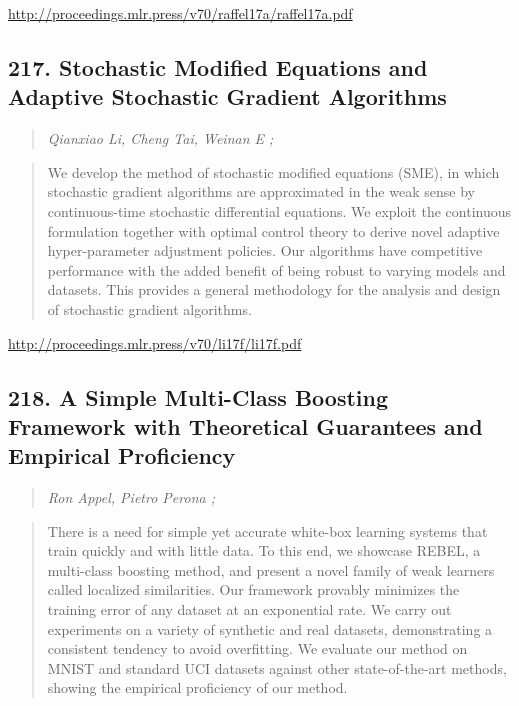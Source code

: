 \documentclass{article}
\begin{document}
\href{http://proceedings.mlr.press/v70/raffel17a/raffel17a.pdf}{http://proceedings.mlr.press/v70/raffel17a/raffel17a.pdf}

\subsection{217. Stochastic Modified Equations and Adaptive Stochastic Gradient Algorithms}

\begin{quote}
\footnotesize{\textit{Qianxiao Li, Cheng Tai, Weinan E ;}}
\end{quote}

\begin{quote}
    We develop the method of stochastic modified equations (SME), in which stochastic gradient algorithms are approximated in the weak sense by continuous-time stochastic differential equations. We exploit the continuous formulation together with optimal control theory to derive novel adaptive hyper-parameter adjustment policies. Our algorithms have competitive performance with the added benefit of being robust to varying models and datasets. This provides a general methodology for the analysis and design of stochastic gradient algorithms.  \end{quote}

\href{http://proceedings.mlr.press/v70/li17f/li17f.pdf}{http://proceedings.mlr.press/v70/li17f/li17f.pdf}

\subsection{218. A Simple Multi-Class Boosting Framework with Theoretical Guarantees and Empirical Proficiency}

\begin{quote}
\footnotesize{\textit{Ron Appel, Pietro Perona ;}}
\end{quote}

\begin{quote}
    There is a need for simple yet accurate white-box learning systems that train quickly and with little data. To this end, we showcase REBEL, a multi-class boosting method, and present a novel family of weak learners called localized similarities. Our framework provably minimizes the training error of any dataset at an exponential rate. We carry out experiments on a variety of synthetic and real datasets, demonstrating a consistent tendency to avoid overfitting. We evaluate our method on MNIST and standard UCI datasets against other state-of-the-art methods, showing the empirical proficiency of our method.  \end{quote}
\end{document}
